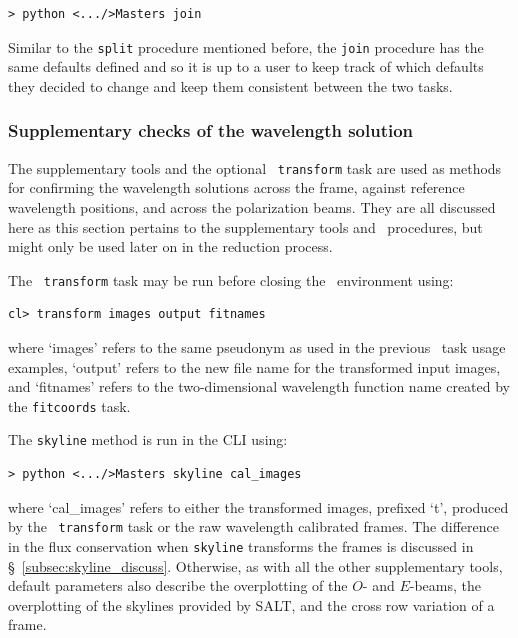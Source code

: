\begin{verbatim}> python <.../>Masters join\end{verbatim}

Similar to the \texttt{split} procedure mentioned before, the \texttt{join} procedure has the same defaults defined and so it is up to a user to keep track of which defaults they decided to change and keep them consistent between the two tasks.


\subsubsection{Supplementary checks of the wavelength solution}

The supplementary tools and the optional \iraf\ \texttt{transform} task are used as methods for confirming the wavelength solutions across the frame, against reference wavelength positions, and across the polarization beams. They are all discussed here as this section pertains to the supplementary tools and \iraf\ procedures, but might only be used later on in the reduction process.
\prgph

The \iraf\ \texttt{transform} task may be run before closing the \iraf\ environment using:

\begin{verbatim}cl> transform images output fitnames\end{verbatim}

\noindent where `images' refers to the same pseudonym as used in the previous \iraf\ task usage examples, `output' refers to the new file name for the transformed input images, and `fitnames' refers to the two-dimensional wavelength function name created by the \texttt{fitcoords} task.
\prgph

The \texttt{skyline} method is run in the \gls{CLI} using:

\begin{verbatim}> python <.../>Masters skyline cal_images\end{verbatim}

\noindent where `cal\_images' refers to either the transformed images, prefixed `t', produced by the \iraf\ \texttt{transform} task or the raw wavelength calibrated frames. The difference in the flux conservation when \texttt{skyline} transforms the frames is discussed in \S~\ref{subsec:skyline_discuss}. Otherwise, as with all the other supplementary tools, default parameters also describe the overplotting of the $O$- and $E$-beams, the overplotting of the skylines provided by \gls{SALT}, and the cross row variation of a frame.
\prgph

